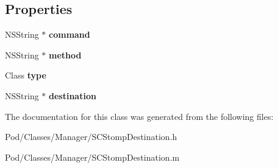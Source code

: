 \subsection*{Properties}
\begin{DoxyCompactItemize}
\item 
N\+S\+String $\ast$ {\bfseries command}\hypertarget{interface_s_c_stomp_destination_afea92fcd82faab02d6c7260ea65c4552}{}\label{interface_s_c_stomp_destination_afea92fcd82faab02d6c7260ea65c4552}

\item 
N\+S\+String $\ast$ {\bfseries method}\hypertarget{interface_s_c_stomp_destination_a7043369d3c1c85d8f8ff975221144454}{}\label{interface_s_c_stomp_destination_a7043369d3c1c85d8f8ff975221144454}

\item 
Class {\bfseries type}\hypertarget{interface_s_c_stomp_destination_aadebd26eb1cd779316c1b5725360c3fb}{}\label{interface_s_c_stomp_destination_aadebd26eb1cd779316c1b5725360c3fb}

\item 
N\+S\+String $\ast$ {\bfseries destination}\hypertarget{interface_s_c_stomp_destination_a0d502c644ab5abe9abada6d87f232918}{}\label{interface_s_c_stomp_destination_a0d502c644ab5abe9abada6d87f232918}

\end{DoxyCompactItemize}


The documentation for this class was generated from the following files\+:\begin{DoxyCompactItemize}
\item 
Pod/\+Classes/\+Manager/S\+C\+Stomp\+Destination.\+h\item 
Pod/\+Classes/\+Manager/S\+C\+Stomp\+Destination.\+m\end{DoxyCompactItemize}
